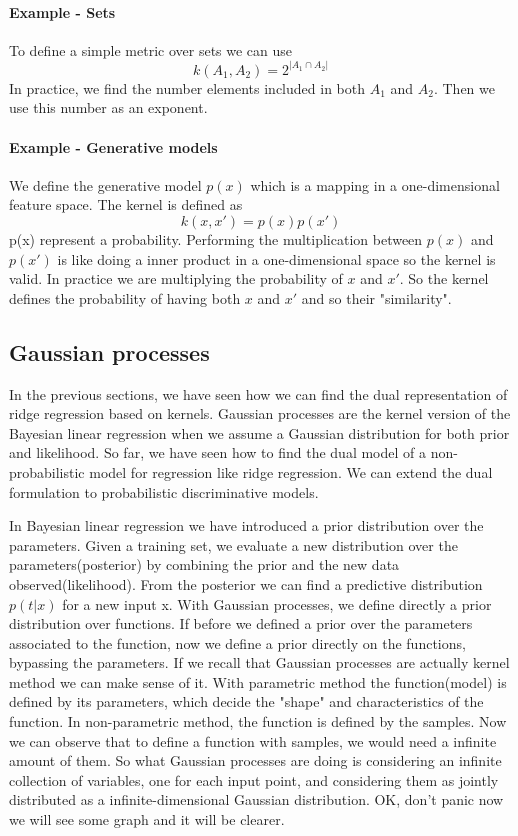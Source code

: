 \documentclass[main.tex]{subfiles}
\begin{document}
\paragraph{Example - Sets} To define a simple metric over sets we can use
\begin{equation}
    k(A_1,A_2) = 2^{|A_1 \cap  A_2|}
\end{equation}
In practice, we find the number elements included in both $A_1$ and $A_2$. Then we use this number as an exponent.
\paragraph{Example - Generative models} We define the generative model $p(x)$ which is a mapping in a one-dimensional feature space. The kernel is defined as
\begin{equation}
    k(x,x') = p(x)p(x')
\end{equation}
p(x) represent a probability. Performing the multiplication between $p(x)$ and $p(x')$ is like doing a inner product in a one-dimensional space so the kernel is valid. In practice we are multiplying the probability of $x$ and $x'$. So the kernel defines the probability of having both $x$ and $x'$ and so their "similarity".

\subsection{Gaussian processes}
In the previous sections, we have seen how we can find the dual representation of ridge regression based on kernels. Gaussian processes are the kernel version of the Bayesian linear regression when we assume a Gaussian distribution for both prior and likelihood. So far, we have seen how to find the dual model of a non-probabilistic model for regression like ridge regression. We can extend the dual formulation to probabilistic discriminative models.

In Bayesian linear regression we have introduced a prior distribution over the parameters. Given a training set, we evaluate a new distribution over the parameters(posterior) by combining the prior and the new data observed(likelihood). From the posterior we can find a predictive distribution $p(t|x)$ for a new input x. With Gaussian processes, we define directly a prior distribution over functions\footnotemark. 
If before we defined a prior over the parameters associated to the function, now we define a prior directly on the functions, bypassing the parameters.
If we recall that Gaussian processes are actually kernel method we can make sense of it.
With parametric method the function(model) is defined by its parameters, which decide the "shape" and characteristics of the function.
In non-parametric method, the function is defined by the samples. Now we can observe that to define a function with samples, we would need a infinite amount of them. So what Gaussian processes are doing is considering an infinite collection of variables, one for each input point, and considering them as jointly distributed as a infinite-dimensional Gaussian distribution. OK, don't panic now we will see some graph and it will be clearer.
\end{document}
